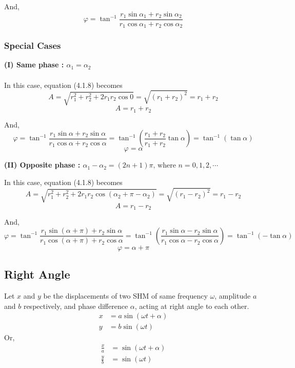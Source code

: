 \documentclass[12pt]{article}
\numberwithin{equation}{subsection}
\begin{document}
And,
\begin{equation}
    \boxed{ \varphi = \tan^{-1}{\frac{r_1 \sin{\alpha_1} + r_2 \sin{\alpha_2}}{r_1 \cos{\alpha_1} + r_2 \cos{\alpha_2}}} }
\end{equation}

\subsubsection{Special Cases}
\textbf{(I) Same phase : $\alpha_1 = \alpha_2$}\\~\\

In this case, equation (4.1.8) becomes \[
    A = \sqrt{r_1^2 + r_2^2 + 2r_1r_2 \cos{0}} = \sqrt{(r_1 + r_2)^2} = r_1 + r_2
\]
\begin{equation}
    \boxed{ A = r_1 + r_2 }
\end{equation}

And, \[
    \varphi = \tan^{-1}{\frac{r_1 \sin{\alpha} + r_2 \sin{\alpha}}{r_1 \cos{\alpha} + r_2 \cos{\alpha}}} = \tan^{-1}{\left( \frac{r_1 + r_2}{r_1 + r_2} \tan{\alpha} \right)} = \tan^{-1}{(\tan{\alpha})}
\]
\begin{equation}
    \boxed{ \varphi = \alpha }
\end{equation}

\textbf{(II) Opposite phase : $\alpha_1 - \alpha_2 = (2n+1)\pi \text{, where } n=0,1,2,\cdots$}

In this case, equation (4.1.8) becomes \[
    A = \sqrt{r_1^2 + r_2^2 + 2r_1r_2 \cos{(\alpha_2 + \pi - \alpha_2)}} = \sqrt{(r_1 - r_2)^2} = r_1 - r_2
\]
\begin{equation}
    \boxed{ A = r_1 - r_2 }
\end{equation}

And, \[
    \varphi = \tan^{-1}{\frac{r_1 \sin{(\alpha + \pi)} + r_2 \sin{\alpha}}{r_1 \cos{(\alpha + \pi)} + r_2 \cos{\alpha}}} = \tan^{-1}{\left( \frac{r_1 \sin{\alpha} - r_2 \sin{\alpha}}{r_1 \cos{\alpha} - r_2 \cos{\alpha}} \right)} = \tan^{-1}{(-\tan{\alpha})}
\]
\begin{equation}
    \boxed{ \varphi = \alpha + \pi }
\end{equation}


\subsection{Right Angle}
Let $x$ and $y$ be the displacements of two SHM of same frequency $\omega$, amplitude $a$ and $b$ respectively, and phase difference $\alpha$, acting at right angle to each other. \\
\begin{align}
    x &= a \sin{(\omega t + \alpha)} \\
    y &= b \sin{(\omega t)}
\end{align}
Or,
\begin{align}
    \frac{x}{a} &= \sin{(\omega t + \alpha)} \\
    \frac{y}{b} &= \sin{(\omega t)}
\end{align}
\end{document}
